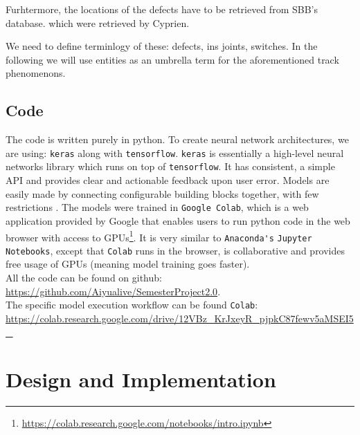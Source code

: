 
Furhtermore, the locations of the defects have to be retrieved from SBB's database. which were retrieved by Cyprien.


We need to define terminlogy of these: defects, ins joints, switches. In the following we will use entities as an umbrella term for the aforementioned track phenomenons.

\section{Code}
The code is written purely in python. To create neural network architectures, we are using: \verb|keras| along with \verb|tensorflow|. \verb|keras| is essentially a high-level neural networks library which runs on top of \verb|tensorflow|. It has consistent, a simple API and provides clear and actionable feedback upon user error. Models are easily made by connecting configurable building blocks together, with few restrictions \cite{TensorFl31:online}. The models were trained in \verb|Google Colab|, which is a web application provided by Google that enables users to run python code in the web browser with access to GPUs\footnote{\url{https://colab.research.google.com/notebooks/intro.ipynb}}. It is very similar to \verb|Anaconda's| \verb|Jupyter Notebooks|, except that \verb|Colab| runs in the browser, is collaborative and provides free usage of GPUs (meaning model training goes faster).\\


\noindent All the code can be found on github: \\
\url{https://github.com/Aiyualive/SemesterProject2.0}.\\

\noindent The specific model execution workflow can be found \verb|Colab|:\\
\url{https://colab.research.google.com/drive/12VBz_KrJxeyR_pjpkC87fewv5aMSEI5_}



\chapter{Design and Implementation}

